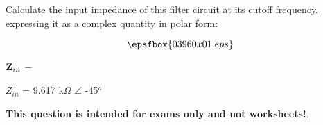 

Calculate the input impedance of this filter circuit at its cutoff frequency, expressing it as a complex quantity in polar form:

$$\epsfbox{03960x01.eps}$$

${\bf Z}_{in}$ = 







$Z_{in}$ = 9.617 k$\Omega$ $\angle$ -45$^{o}$







{\bf This question is intended for exams only and not worksheets!}.



